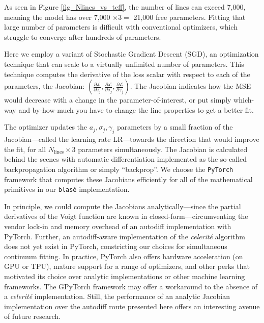 \documentclass[modern]{aastex631}
\begin{document}
As seen in Figure \ref{fig_Nlines_vs_teff}, the number of lines can exceed 7,000, meaning the model has over 7,000 $\times 3 =$ 21,000 free parameters. Fitting that large number of parameters is difficult with conventional optimizers, which struggle to converge after hundreds of parameters.

Here we employ a variant of Stochastic Gradient Descent (SGD), an optimization technique that can scale to a virtually unlimited number of parameters. This technique computes the derivative of the loss scalar with respect to each of the parameters, the Jacobian: $(\frac{\partial \mathcal{L}}{\partial a_j}, \frac{\partial \mathcal{L}}{\partial \sigma_j}, \frac{\partial \mathcal{L}}{\partial \gamma_j})$. The Jacobian indicates how the MSE would decrease with a change in the parameter-of-interest, or put simply which-way and by-how-much you have to change the line properties to get a better fit.

The optimizer updates the $a_j, \sigma_j, \gamma_j$ parameters by a small fraction of the Jacobian---called the learning rate LR---towards the direction that would improve the fit, for all $N_{\mathrm{lines}} \times 3$ parameters simultaneously. The Jacobian is calculated behind the scenes with automatic differentiation implemented as the so-called backpropagation algorithm or simply ``backprop''. We choose the \texttt{PyTorch} framework that computes these Jacobians efficiently for all of the mathematical primitives in our \texttt{blas\'e} implementation.

In principle, we could compute the Jacobians analytically---since the partial derivatives of the Voigt function are known in closed-form---circumventing the vendor lock-in and memory overhead of an autodiff implementation with PyTorch. Further, an autodiff-aware implementation of the \emph{celerit\'e} algorithm does not yet exist in PyTorch, constricting our choices for simultaneous continuum fitting. In practice, PyTorch also offers hardware acceleration (on GPU or TPU), mature support for a range of optimizers, and other perks that motivated its choice over analytic implementations or other machine learning frameworks. The GPyTorch framework may offer a workaround to the absence of a \emph{celerit\'e} implementation. Still, the performance of an analytic Jacobian implementation over the autodiff route presented here offers an interesting avenue of future research.
\end{document}
